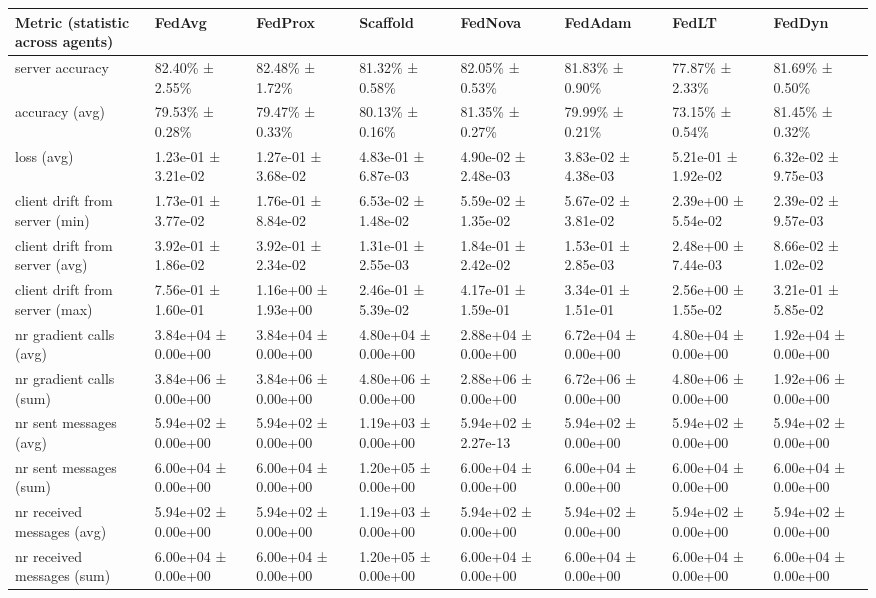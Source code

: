 \begin{tabular}{llllllll}
\hline
 Metric (statistic across agents)   & FedAvg              & FedProx             & Scaffold            & FedNova             & FedAdam             & FedLT               & FedDyn              \\
\hline
 server accuracy                    & 82.40\% ± 2.55\%      & 82.48\% ± 1.72\%      & 81.32\% ± 0.58\%      & 82.05\% ± 0.53\%      & 81.83\% ± 0.90\%      & 77.87\% ± 2.33\%      & 81.69\% ± 0.50\%      \\
 accuracy (avg)                     & 79.53\% ± 0.28\%      & 79.47\% ± 0.33\%      & 80.13\% ± 0.16\%      & 81.35\% ± 0.27\%      & 79.99\% ± 0.21\%      & 73.15\% ± 0.54\%      & 81.45\% ± 0.32\%      \\
 loss (avg)                         & 1.23e-01 ± 3.21e-02 & 1.27e-01 ± 3.68e-02 & 4.83e-01 ± 6.87e-03 & 4.90e-02 ± 2.48e-03 & 3.83e-02 ± 4.38e-03 & 5.21e-01 ± 1.92e-02 & 6.32e-02 ± 9.75e-03 \\
 client drift from server (min)     & 1.73e-01 ± 3.77e-02 & 1.76e-01 ± 8.84e-02 & 6.53e-02 ± 1.48e-02 & 5.59e-02 ± 1.35e-02 & 5.67e-02 ± 3.81e-02 & 2.39e+00 ± 5.54e-02 & 2.39e-02 ± 9.57e-03 \\
 client drift from server (avg)     & 3.92e-01 ± 1.86e-02 & 3.92e-01 ± 2.34e-02 & 1.31e-01 ± 2.55e-03 & 1.84e-01 ± 2.42e-02 & 1.53e-01 ± 2.85e-03 & 2.48e+00 ± 7.44e-03 & 8.66e-02 ± 1.02e-02 \\
 client drift from server (max)     & 7.56e-01 ± 1.60e-01 & 1.16e+00 ± 1.93e+00 & 2.46e-01 ± 5.39e-02 & 4.17e-01 ± 1.59e-01 & 3.34e-01 ± 1.51e-01 & 2.56e+00 ± 1.55e-02 & 3.21e-01 ± 5.85e-02 \\
 nr gradient calls (avg)            & 3.84e+04 ± 0.00e+00 & 3.84e+04 ± 0.00e+00 & 4.80e+04 ± 0.00e+00 & 2.88e+04 ± 0.00e+00 & 6.72e+04 ± 0.00e+00 & 4.80e+04 ± 0.00e+00 & 1.92e+04 ± 0.00e+00 \\
 nr gradient calls (sum)            & 3.84e+06 ± 0.00e+00 & 3.84e+06 ± 0.00e+00 & 4.80e+06 ± 0.00e+00 & 2.88e+06 ± 0.00e+00 & 6.72e+06 ± 0.00e+00 & 4.80e+06 ± 0.00e+00 & 1.92e+06 ± 0.00e+00 \\
 nr sent messages (avg)             & 5.94e+02 ± 0.00e+00 & 5.94e+02 ± 0.00e+00 & 1.19e+03 ± 0.00e+00 & 5.94e+02 ± 2.27e-13 & 5.94e+02 ± 0.00e+00 & 5.94e+02 ± 0.00e+00 & 5.94e+02 ± 0.00e+00 \\
 nr sent messages (sum)             & 6.00e+04 ± 0.00e+00 & 6.00e+04 ± 0.00e+00 & 1.20e+05 ± 0.00e+00 & 6.00e+04 ± 0.00e+00 & 6.00e+04 ± 0.00e+00 & 6.00e+04 ± 0.00e+00 & 6.00e+04 ± 0.00e+00 \\
 nr received messages (avg)         & 5.94e+02 ± 0.00e+00 & 5.94e+02 ± 0.00e+00 & 1.19e+03 ± 0.00e+00 & 5.94e+02 ± 0.00e+00 & 5.94e+02 ± 0.00e+00 & 5.94e+02 ± 0.00e+00 & 5.94e+02 ± 0.00e+00 \\
 nr received messages (sum)         & 6.00e+04 ± 0.00e+00 & 6.00e+04 ± 0.00e+00 & 1.20e+05 ± 0.00e+00 & 6.00e+04 ± 0.00e+00 & 6.00e+04 ± 0.00e+00 & 6.00e+04 ± 0.00e+00 & 6.00e+04 ± 0.00e+00 \\
\hline
\end{tabular}